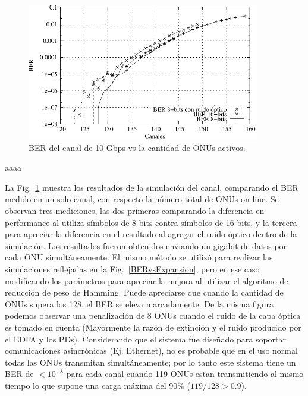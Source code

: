 
\begin{figure}[t]
  \centering
  \includegraphics[width=4in]{graphs/BER-tesis.pdf} 
  \caption{BER del canal de 10 Gbps vs la cantidad de ONUs activos.}
  \label{sim:access}
\end{figure}
aaaa

La Fig.~\ref{sim:access} muestra los resultados de la simulación del canal, comparando el BER medido en un solo canal, con respecto la número total de ONUs on-line. Se observan tres mediciones, las dos primeras comparando la diferencia en performance al utiliza símbolos de 8 bits contra símbolos de 16 bits, y la tercera para apreciar la diferencia en el resultado al agregar el ruido óptico dentro de la simulación.
Los resultados fueron obtenidos enviando un gigabit de datos por cada ONU simultáneamente. El mismo método se utilizó para realizar las simulaciones reflejadas en la Fig.~\ref{BERvsExpansion}, pero en ese caso modificando los parámetros para apreciar la mejora al utilizar el algoritmo de reducción de peso de Hamming.
Puede apreciarse que cuando la cantidad de ONUs supera los 128, el BER se eleva marcadamente.
De la misma figura podemos observar una penalización de $8$ ONUs cuando el ruido de la capa óptica es tomado en cuenta (Mayormente la razón de extinción y el ruido producido por el EDFA y los PDs).
Considerando que el sistema fue diseñado para soportar comunicaciones asincrónicas (Ej. Ethernet), no es probable que en el uso normal todas las ONUs transmitan simultáneamente; por lo tanto este sistema tiene un BER de $<10^{-8}$ para cada canal cuando 119 ONUs estan transmitiendo al mismo tiempo lo que supone una carga máxima del $90\%$ ($119/128>0.9$). 


